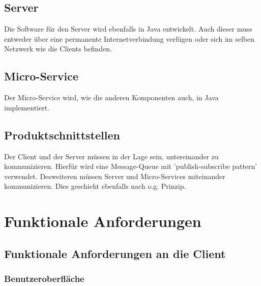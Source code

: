 \documentclass[11pt]{article} %
\begin{document}
\subsection{Server}

Die Software für den Server wird ebenfalls in Java entwickelt. Auch dieser muss entweder über eine permanente Internetverbindung verfügen oder sich im selben Netzwerk wie die Clients befinden.

\subsection{Micro-Service}

Der Micro-Service wird, wie die anderen Komponenten auch, in Java implementiert.

\subsection{Produktschnittstellen}

Der Client und der Server müssen in der Lage sein, untereinander zu kommunizieren. Hierfür wird eine Message-Queue mit 'publish-subscribe pattern' verwendet.
Desweiteren müssen Server und Micro-Services miteinander kommunizieren. Dies geschieht ebenfalls nach o.g. Prinzip.

\clearpage

\section{Funktionale Anforderungen}

\subsection{Funktionale Anforderungen an die Client}

\subsubsection{Benutzeroberfläche}
\end{document}
